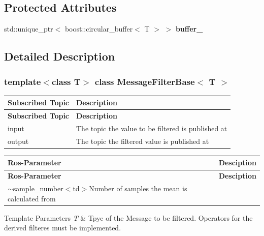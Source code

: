 \subsection*{Protected Attributes}
\begin{DoxyCompactItemize}
\item 
\mbox{\label{classMessageFilterBase_a0b7db0e443e75ce02ef154f233adc97d}} 
std\+::unique\+\_\+ptr$<$ boost\+::circular\+\_\+buffer$<$ T $>$ $>$ {\bfseries buffer\+\_\+}
\end{DoxyCompactItemize}


\subsection{Detailed Description}
\subsubsection*{template$<$class T$>$\newline
class Message\+Filter\+Base$<$ T $>$}

\tabulinesep=1mm
\begin{longtabu} spread 0pt [c]{*{2}{|X[-1]}|}
\hline
\rowcolor{\tableheadbgcolor}\textbf{ Subscribed Topic}&\textbf{ Description  }\\
\endfirsthead
\hline
\endfoot
\hline
\rowcolor{\tableheadbgcolor}\textbf{ Subscribed Topic}&\textbf{ Description  }\\
\endhead
input&The topic the value to be filtered is published at \\
output&The topic the filtered value is published at \\
\end{longtabu}
\tabulinesep=1mm
\begin{longtabu} spread 0pt [c]{*{2}{|X[-1]}|}
\hline
\rowcolor{\tableheadbgcolor}\textbf{ Ros-\/\+Parameter}&\textbf{ Desciption  }\\
\endfirsthead
\hline
\endfoot
\hline
\rowcolor{\tableheadbgcolor}\textbf{ Ros-\/\+Parameter}&\textbf{ Desciption  }\\
\endhead
$\sim$sample\+\_\+number$<$td$>$Number of samples the mean is calculated from \\
\end{longtabu}

\begin{DoxyTemplParams}{Template Parameters}
{\em T} & Tpye of the Message to be filtered. Operators for the derived filteres must be implemented. \\
\hline
\end{DoxyTemplParams}


